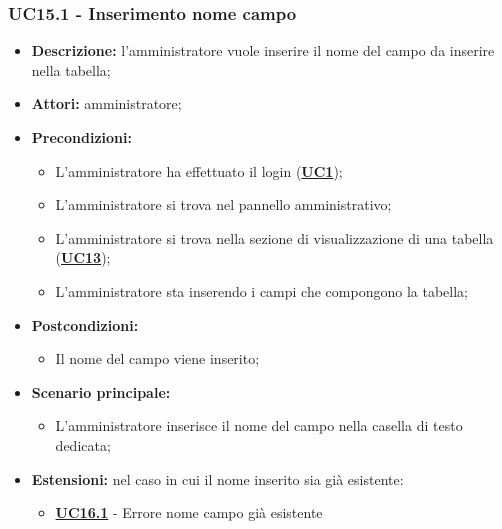 \subsubsection{UC15.1 - Inserimento nome campo}
\label{sec:UC15.1}
\begin{itemize}
	\item \textbf{Descrizione:} l’amministratore vuole inserire il nome del campo da inserire nella tabella;
	\item \textbf{Attori:} amministratore;
	\item \textbf{Precondizioni:} 
	\begin{itemize}
		\item L’amministratore ha effettuato il login (\hyperref[sec:UC1]{\textbf{UC1}});
		\item L’amministratore si trova nel pannello amministrativo;
		\item L’amministratore si trova nella sezione di visualizzazione di una tabella (\hyperref[sec:UC13]{\textbf{UC13}});
		\item L’amministratore sta inserendo i campi che compongono la tabella;
	\end{itemize}
	\item \textbf{Postcondizioni:} 
	\begin{itemize}
		\item Il nome del campo viene inserito;
	\end{itemize}
	\item \textbf{Scenario principale:} 
	\begin{itemize}
		\item L’amministratore inserisce il nome del campo nella casella di testo dedicata;
	\end{itemize}
	\item \textbf{Estensioni:} nel caso in cui il nome inserito sia già esistente:
	\begin{itemize}
		\item \hyperref[sec:UC16.1]{\textbf{UC16.1}} - Errore nome campo già esistente
	\end{itemize}
\end{itemize}

